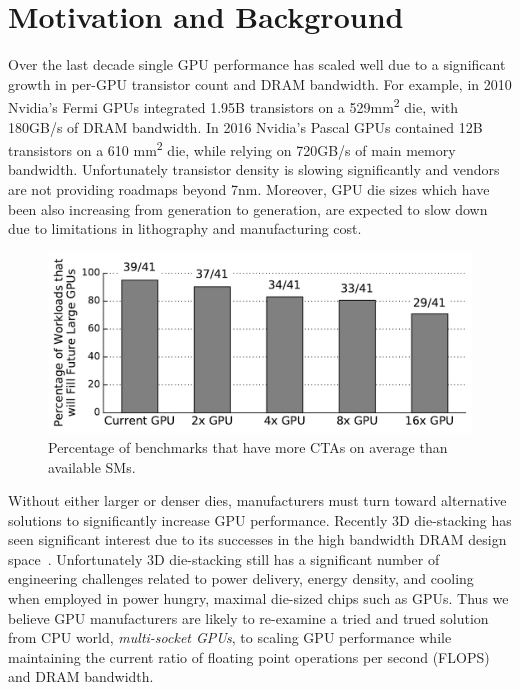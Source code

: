 \section{Motivation and Background}
\label{sec:background}

Over the last decade single GPU performance has scaled well due to a 
significant growth in per-GPU transistor count and DRAM bandwidth. For 
example, in 2010 Nvidia's Fermi GPUs integrated 1.95B transistors on a 
529mm\textsuperscript{2} die, with 180GB/s of DRAM bandwidth.  In 2016 
Nvidia's Pascal GPUs contained 12B transistors on a 610 mm\textsuperscript{2} 
die, while relying on 720GB/s of main memory bandwidth. Unfortunately 
transistor density is slowing significantly and vendors are not providing 
roadmaps beyond 7nm. Moreover, GPU die sizes which have been also increasing 
from generation to generation, are expected to slow down due to limitations 
in lithography and manufacturing cost.

\begin{figure}[t] 
    \centering
    \includegraphics[width=1.0\columnwidth]{figures/plot_ctas_per_sm.pdf}
    \caption{Percentage of benchmarks that have more CTAs on average than 
available SMs.}
    \label{fig:ctas}
    \vspace{-.2in}
\end{figure}

Without either larger or denser dies, manufacturers must turn toward 
alternative solutions to significantly increase GPU performance.  Recently 3D 
die-stacking has seen significant interest due to its successes in the high 
bandwidth DRAM design space~\cite{HBM}. Unfortunately 3D die-stacking still has 
a significant number of engineering challenges related to power delivery, 
energy density, and cooling~\cite{verbree2010cost} when employed in power 
hungry, maximal die-sized chips such as GPUs. Thus we believe GPU manufacturers 
are likely to re-examine a tried and trued solution from CPU world, 
\textit{multi-socket GPUs}, to scaling GPU performance while maintaining the 
current ratio of floating point operations per second (FLOPS) and DRAM 
bandwidth.

